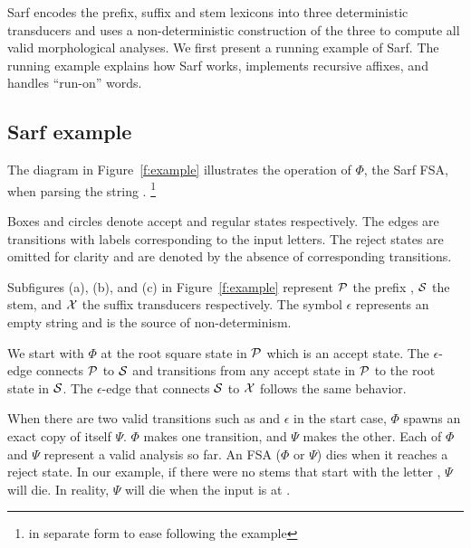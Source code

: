 \documentclass[11pt]{article}
\begin{document}
Sarf encodes the prefix, suffix and stem lexicons into
three deterministic transducers and 
uses a non-deterministic construction
of the three to compute all valid morphological analyses.
We first present a running example of Sarf.
The running example explains how Sarf works,
implements recursive affixes, and
handles ``run-on'' words.

\subsection{Sarf example}
\label{sec:example}

\transfalse
\begin{figure}[tb]
\end{figure}
\transtrue


The diagram in Figure~\ref{f:example}
illustrates the operation of $\Phi$, the Sarf FSA,
when parsing the
string .
\footnote{ 
%
in separate form to ease following the example
}

Boxes and circles denote accept and regular
states respectively.
The edges are transitions with labels corresponding to
the input letters.
The reject states are omitted for clarity and are denoted
by the absence of corresponding transitions. 

Subfigures (a), (b), and (c) in Figure~\ref{f:example}
represent ${\cal P}$ the prefix ,
${\cal S}$ the stem, and ${\cal X}$ the suffix
transducers respectively. 
The symbol $\epsilon$ represents an empty string and is 
the source of non-determinism.

We start with $\Phi$ at the root square state in 
${\cal P}$ which is an accept state. 
The $\epsilon$-edge connects ${\cal P}$
to ${\cal S}$ and transitions from any accept state
in ${\cal P}$ to the root state in ${\cal S}$.
The $\epsilon$-edge that connects ${\cal S}$ to ${\cal X}$
follows the same behavior. 

When there are two valid transitions such as  
and $\epsilon$ in the start case, 
$\Phi$ spawns an exact copy of itself $\Psi$. 
$\Phi$ makes one transition, and $\Psi$ makes the other. 
Each of $\Phi$ and $\Psi$ represent a valid analysis so far. 
An FSA ($\Phi$ or $\Psi$) dies when it reaches a reject state.
In our example, if there were no stems that start 
with the letter , $\Psi$ will die. 
In reality, $\Psi$ will die when the input 
is at . 
\end{document}

